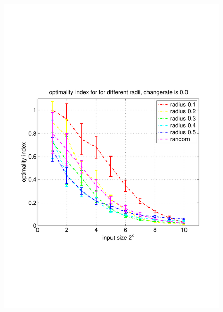 \documentclass[11pt]{article}
\begin{document}
\begin{figure}[h!]
	\includegraphics[trim=0 180 0 180, clip,width=\linewidth]{../../code/data/2014_12_12_00_55_41/figure_1}
\end{figure}
\end{document}

